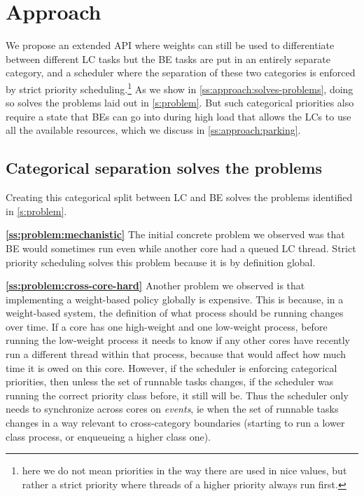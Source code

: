 \section{Approach}\label{s:approach}

We propose an extended \cgroups{} API where weights can still be used to
differentiate between different LC tasks but the BE tasks are put in an entirely
separate category, and a scheduler where the separation of these two categories
is enforced by strict priority scheduling.\footnote{here we do not mean
priorities in the way there are used in nice values, but rather a strict
priority where threads of a higher priority always run first.} As we show in
\autoref{ss:approach:solves-problems}, doing so solves the problems laid out in
\autoref{s:problem}. But such categorical priorities also require a state that
BEs can go into during high load that allows the LCs to use all the available
resources, which we discuss in \autoref{ss:approach:parking}.

\subsection{Categorical separation solves the
problems}\label{ss:approach:solves-problems}

Creating this categorical split between LC and BE  solves the problems
identified in \autoref{s:problem}.

\textbf{\autoref{ss:problem:mechanistic}} The initial concrete problem we
observed was that BE would sometimes run even while another core had a queued LC
thread. Strict priority scheduling solves this problem because it is by
definition global.

\textbf{\autoref{ss:problem:cross-core-hard}} Another problem we observed is
that implementing a weight-based policy globally is expensive. This is because,
in a weight-based system, the definition of what process should be running
changes over time. If a core has one high-weight and one low-weight process,
before running the low-weight process it needs to know if any other cores have
recently run a different thread within that process, because that would affect
how much time it is owed on this core. However, if the scheduler is enforcing
categorical priorities, then unless the set of runnable tasks changes, if the
scheduler was running the correct priority class before, it still will be. Thus
the scheduler only needs to synchronize across cores on \textit{events}, ie when
the set of runnable tasks changes in a way relevant to cross-category boundaries
(starting to run a lower class process, or enqueueing a higher class one).

